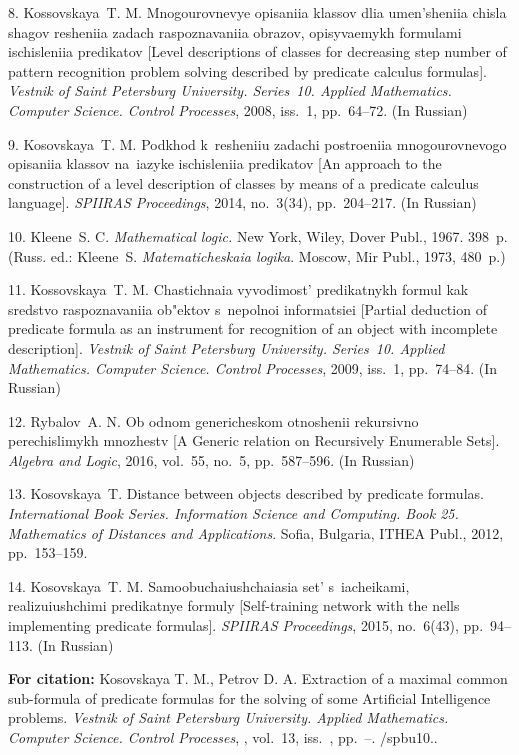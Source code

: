 {8. Kossovskaya~T. M. Mnogourovnevye opisaniia klassov dlia
umen'sheniia chisla shagov resheniia zadach raspoznavaniia
obrazov, opisyvaemykh formulami ischisleniia predikatov [Level
descriptions of classes for decreasing step number of pattern
recognition problem solving described by predicate calculus
formulas]. {\it Vestnik of Saint Petersburg University. Series~10.
Applied Mathematics. Computer Science. Control Processes}, 2008,
iss.~1, pp.~64--72. (In Russian)

9. Kosovskaya~T. M. Podkhod k~resheniiu zadachi postroeniia
mnogourovnevogo opisaniia klassov na~iazyke ischisleniia
predikatov [An approach to the construction of a level description
of classes by means of a predicate calculus language]. {\it
SPIIRAS Proceedings}, 2014, no.~3(34), pp.~204--217. (In Russian)

10. Kleene~S. C. {\it Mathematical logic.} New York, Wiley, Dover
Publ.,  1967. 398~p. (Russ. ed.: Kleene~S. {\it Matematicheskaia
logika}.  Moscow, Mir Publ., 1973, 480~p.)




11. Kossovskaya~T. M. Chastichnaia vyvodimost' predikatnykh formul
kak sredstvo raspoznavaniia ob"ektov s~nepolnoi informatsiei
[Partial deduction of predicate formula as an instrument for
recognition of  an object with incomplete description]. {\it
Vestnik of Saint Petersburg University. Series~10. Applied
Mathematics. Computer Science. Control Processes}, 2009, iss.~1,
pp.~74--84. (In Russian)

12. Rybalov~A. N. Ob odnom genericheskom otnoshenii rekursivno
perechislimykh mnozhestv [A Generic relation on Recursively
Enumerable Sets]. {\it Algebra and Logic}, 2016, vol.~55, no.~5,
pp.~587--596. (In Russian)

13. Kosovskaya~T. Distance between objects described by predicate formulas. {\it International Book Series. Information Science and Computing. Book 25.  Mathematics of Distances and Applications}. %
 Sofia, Bulgaria,  ITHEA  Publ., 2012, pp.~153--159.

14. Kosovskaya~T. M. Samoobuchaiushchaiasia set' s~iacheikami,
realizuiushchimi predikatnye formuly [Self-training network with
the nells implementing predicate formulas]. {\it SPIIRAS
Proceedings}, 2015, no.~6(43), pp.~94--113. (In Russian)






\vskip 2mm

{\bf For citation:}   Kosovskaya T. M., Petrov D. A. Extraction of
a maximal common sub-formula of predicate formulas for the solving
of some Artificial Intelligence problems. {\it Vestnik of Saint
Petersburg University. Applied Mathematics. Computer Science.
Control Processes}, \issueyear, vol.~13, iss.~\issuenum,
pp.~\pageref{p3}--\pageref{p3e}.
\doivyp/spbu10.\issueyear.



}
